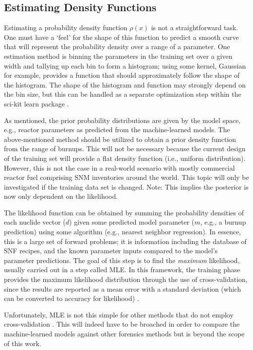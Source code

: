 \subsection{Estimating Density Functions}

Estimating a probability density function $\rho(x)$ is not a straightforward
task.  One must have a `feel' for the shape of this function to predict a
smooth curve that will represent the probability density over a range of a
parameter.  One estimation method is binning the parameters in the training set
over a given width and tallying up each bin to form a histogram; using some
kernel, Gaussian for example, provides a function that should approximately
follow the shape of the histogram. The shape of the histogram and function may
strongly depend on the bin size, but this can be handled as a separate
optimization step within the sci-kit learn package \cite{scikit}.

As mentioned, the prior probability distributions are given by the model space,
e.g., reactor parameters as predicted from the machine-learned models.  The
above-mentioned method should be utilized to obtain a prior density function
from the range of burnups.  This will not be necessary because the current
design of the training set will provide a flat density function (i.e., uniform
distribution). However, this is not the case in a real-world scenario with
mostly commercial reactor fuel comprising \gls{SNM} inventories around the
world.  This topic will only be investigated if the training data set is
changed. \cite{bayes_compare} Note: This implies the posterior is now only
dependent on the likelihood.

The likelihood function can be obtained by summing the probability densities of
each nuclide vector ($d$) given some predicted model parameter ($m$, e.g., a
burnup prediction) using some algorithm (e.g., nearest neighbor regression).
In essence, this is a large set of forward problems; it is information
including the database of \gls{SNF} recipes, and the known parameter inputs
compared to the model's parameter predictions.  The goal of this step is to
find the \textit{maximum} likelihood, usually carried out in a step called
\gls{MLE}. In this framework, the training phase provides the maximum
likelihood distribution through the use of cross-validation, since the results
are reported as a mean error with a standard deviation (which can be
converted to accuracy for likelihood) \cite{scikit}. 

Unfortunately, \gls{MLE} is not this simple for other methods that do not
employ cross-validation \cite{gentle_bayes, bayes_compare}. This will indeed
have to be broached in order to compare the machine-learned models against
other forensics methods but is beyond the scope of this work.

